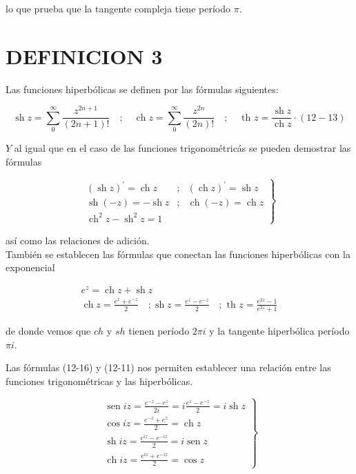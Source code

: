 \documentclass[10pt]{article}
\theoremstyle{plain}
\theoremstyle{definition}
\theoremstyle{remark}
\begin{document}
lo que prueba que la tangente compleja tiene período $\pi$.

\section*{DEFINICION 3}
Las funciones hiperbólicas se definen por las fórmulas siguientes:

$$
\operatorname{sh} z=\sum_{0}^{\infty} \frac{z^{2 n+1}}{(2 n+1)!} \quad ; \quad \operatorname{ch} z=\sum_{0}^{\infty} \frac{z^{2 n}}{(2 n)!} \quad ; \quad \text { th } z=\frac{\operatorname{sh} z}{\operatorname{ch} z} \cdot(12-13)
$$

$Y$ al igual que en el caso de las funciones trigonométricás se pueden demostrar las fórmulas


\[
\left.\begin{array}{lll}
(\operatorname{sh} z)^{\prime}=\operatorname{ch} z & ; & (\operatorname{ch} z)^{\prime}=\operatorname{sh} z  \tag{$12\cdot14$}\\
\operatorname{sh}(-z)=-\operatorname{sh} z & ; & \operatorname{ch}(-z)=\operatorname{ch} z \\
\operatorname{ch}^{2} z-\operatorname{sh}^{2} z=1 &
\end{array}\right\}
\]

así como las relaciones de adición.\\
También se establecen las fórmulas que conectan las funciones hiperbólicas con la exponencial


\begin{gather*}
e^{z}=\operatorname{ch} z+\operatorname{sh} z  \tag{12-15}\\
\operatorname{ch} z=\frac{e^{z}+e^{-z}}{2} \quad ; \operatorname{sh} z=\frac{e^{z}-e^{-z}}{2} \quad ; \text { th } z=\frac{e^{2 z}-1}{e^{2 z}+1} \tag{12-16}
\end{gather*}


de donde vemos que $c h$ y $s h$ tienen período $2 \pi i$ y la tangente hiperbólica período $\pi i$.

Las fórmulas (12-16) y (12-11) nos permiten establecer una relación entre las funciones trigonométricas y las hiperbólicas.

\[
\left.\begin{array}{l}
\operatorname{sen} i z=\frac{e^{-z}-e^{z}}{2 i}=i \frac{e^{z}-e^{-z}}{2}=i \operatorname{sh} z  \tag{12-17}\\
\cos i z=\frac{e^{-z}+e^{z}}{2}=\operatorname{ch} z \\
\operatorname{sh} i z=\frac{e^{i z}-e^{-i z}}{2}=i \operatorname{sen} z \\
\operatorname{ch} i z=\frac{e^{i z}+e^{-i z}}{2}=\cos z
\end{array}\right\}
\]
\end{document}
